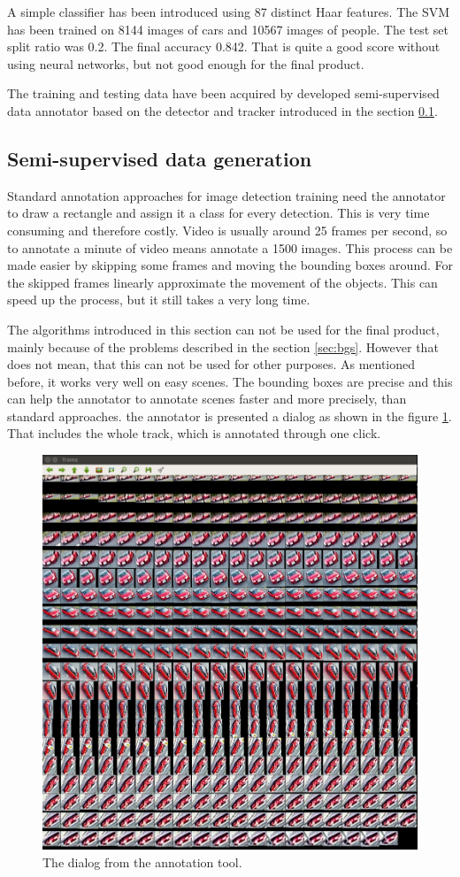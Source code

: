 \documentclass[a4paper,12pt,titlepage, twoside]{article}
\numberwithin{figure}{section}
\begin{document}
A simple classifier has been introduced using 87 distinct Haar features. The SVM has been trained on 8144 images of cars and 10567 images of people. The test set split ratio was 0.2. The final accuracy 0.842. That is quite a good score without using neural networks, but not good enough for the final product.




The training and testing data have been acquired by developed semi-supervised data annotator based on the detector and tracker introduced in the section \ref{sec:data-generation}.

\subsection{Semi-supervised data generation} 
\label{sec:data-generation}

Standard annotation approaches for image detection training need the annotator to draw a rectangle and assign it a class for every detection. This is very time consuming and therefore costly. Video is usually around 25 frames per second, so to annotate a minute of video means annotate a 1500 images. This process can be made easier by skipping some frames and moving the bounding boxes around. For the skipped frames linearly approximate the movement of the objects. This can speed up the process, but it still takes a very long time. 


The algorithms introduced in this section can not be used for the final product, mainly because of the problems described in the section \ref{sec:bgs}. However that does not mean, that this can not be used for other purposes. As mentioned before, it works very well on easy scenes. The bounding boxes are precise and this can help the annotator to annotate scenes faster and more precisely, than standard approaches. the annotator is presented a dialog as shown in the figure \ref{fig:labeling}. That includes the whole track, which is annotated through one click. 


\begin{figure}[h!]
\centering
\includegraphics[width=0.5\linewidth]{fig/omni_labeling.png}
\caption{The dialog from the annotation tool.}
\label{fig:labeling}
\end{figure}
\end{document}
